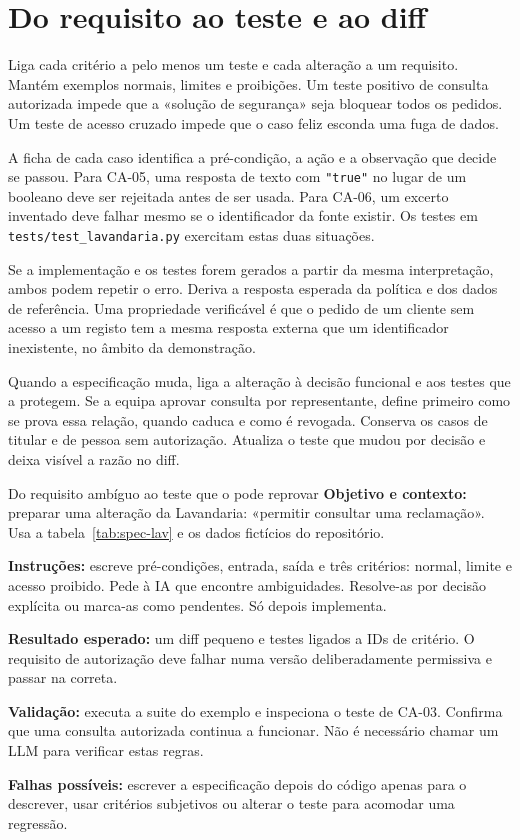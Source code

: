 \section{Do requisito ao teste e ao diff}
Liga cada critério a pelo menos um teste e cada alteração a um requisito. Mantém exemplos normais, limites e proibições. Um teste positivo de consulta autorizada impede que a «solução de segurança» seja bloquear todos os pedidos. Um teste de acesso cruzado impede que o caso feliz esconda uma fuga de dados.

A ficha de cada caso identifica a pré-condição, a ação e a observação que decide se passou. Para CA-05, uma resposta de texto com \texttt{"true"} no lugar de um booleano deve ser rejeitada antes de ser usada. Para CA-06, um excerto inventado deve falhar mesmo se o identificador da fonte existir. Os testes em \nolinkurl{tests/test_lavandaria.py} exercitam estas duas situações.

Se a implementação e os testes forem gerados a partir da mesma interpretação, ambos podem repetir o erro. Deriva a resposta esperada da política e dos dados de referência. Uma propriedade verificável é que o pedido de um cliente sem acesso a um registo tem a mesma resposta externa que um identificador inexistente, no âmbito da demonstração.

Quando a especificação muda, liga a alteração à decisão funcional e aos testes que a protegem. Se a equipa aprovar consulta por representante, define primeiro como se prova essa relação, quando caduca e como é revogada. Conserva os casos de titular e de pessoa sem autorização. Atualiza o teste que mudou por decisão e deixa visível a razão no diff.

\begin{promptlabbox}{Do requisito ambíguo ao teste que o pode reprovar}
\textbf{Objetivo e contexto:} preparar uma alteração da Lavandaria: «permitir consultar uma reclamação». Usa a tabela~\ref{tab:spec-lav} e os dados fictícios do repositório.

\textbf{Instruções:} escreve pré-condições, entrada, saída e três critérios: normal, limite e acesso proibido. Pede à IA que encontre ambiguidades. Resolve-as por decisão explícita ou marca-as como pendentes. Só depois implementa.

\textbf{Resultado esperado:} um diff pequeno e testes ligados a IDs de critério. O requisito de autorização deve falhar numa versão deliberadamente permissiva e passar na correta.

\textbf{Validação:} executa a suite do exemplo e inspeciona o teste de CA-03. Confirma que uma consulta autorizada continua a funcionar. Não é necessário chamar um LLM para verificar estas regras.

\textbf{Falhas possíveis:} escrever a especificação depois do código apenas para o descrever, usar critérios subjetivos ou alterar o teste para acomodar uma regressão.
\end{promptlabbox}

